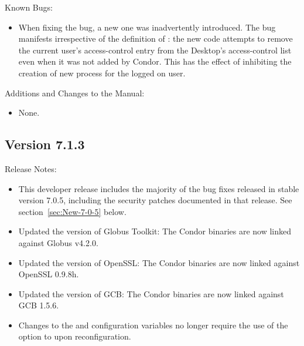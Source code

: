 \noindent Known Bugs:

\begin{itemize}

\item When fixing the  bug, a new one was
inadvertently introduced.  The bug manifests irrespective of the definition
of : the new code attempts to remove the current 
user's access-control entry from the Desktop's access-control list even when
it was not added by Condor.  This has the effect of inhibiting the creation
of new process for the logged on user.

\end{itemize}

\noindent Additions and Changes to the Manual:

\begin{itemize}

\item None.

\end{itemize}



\subsection*{\label{sec:New-7-1-3}Version 7.1.3}

\noindent Release Notes:

\begin{itemize}

\item This developer release includes the majority of the bug fixes released
	in stable version 7.0.5, including the security patches documented in that
	release.  See section~\ref{sec:New-7-0-5} below.

\item Updated the version of Globus Toolkit: The Condor binaries are now
	linked against Globus v4.2.0.

\item Updated the version of OpenSSL: The Condor binaries are now linked
	against OpenSSL 0.9.8h.

\item Updated the version of GCB: The Condor binaries are now linked
	against GCB 1.5.6.

\item Changes to the  and  configuration
	variables no longer require the use of the  option to
	 upon reconfiguration.

\end{itemize}

